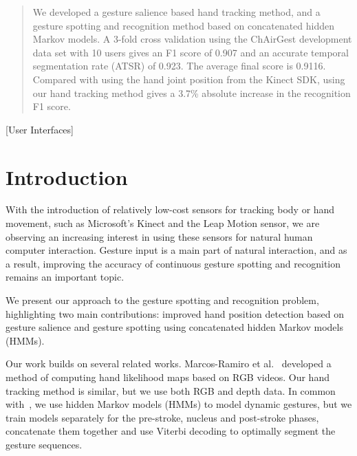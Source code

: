 \documentclass{sig-alternate-2013}
\begin{document}
\maketitle
\begin{abstract}
We developed a gesture salience based hand tracking method, and a gesture
spotting and recognition method based on concatenated hidden Markov models.
A 3-fold cross validation using the ChAirGest development data set with 10 users gives an F1 score of 0.907
and an accurate temporal segmentation rate (ATSR) of 0.923. The average final
score is 0.9116. Compared with using the hand joint position from the Kinect
SDK, using our hand tracking method gives a 3.7\% absolute increase in the
recognition F1 score.
\end{abstract}

[User Interfaces]


\section{Introduction}
With the introduction of relatively low-cost sensors for tracking body or hand
movement, such as Microsoft's Kinect and the Leap Motion sensor, we are observing 
an increasing interest in using these sensors for natural human computer
interaction.
Gesture input is a main part of natural interaction, and as a result, improving the accuracy of
continuous gesture spotting and recognition remains an important topic.

We present our approach to the gesture spotting and recognition problem,
highlighting two main contributions:
improved hand position detection based on gesture salience and gesture spotting
using concatenated hidden Markov models (HMMs).

Our work builds on several related works. Marcos-Ramiro et al.~\cite{marcos2013} developed a method of computing hand likelihood maps based on RGB videos. 
Our hand tracking method is similar, but we use both RGB and depth data. 
In common with~\cite{Starner95, yin10}, we use hidden Markov models (HMMs) to model dynamic gestures,
but we train models separately for the pre-stroke, nucleus and post-stroke phases, concatenate them together and use Viterbi decoding to optimally segment the
gesture sequences. 
\end{document}
